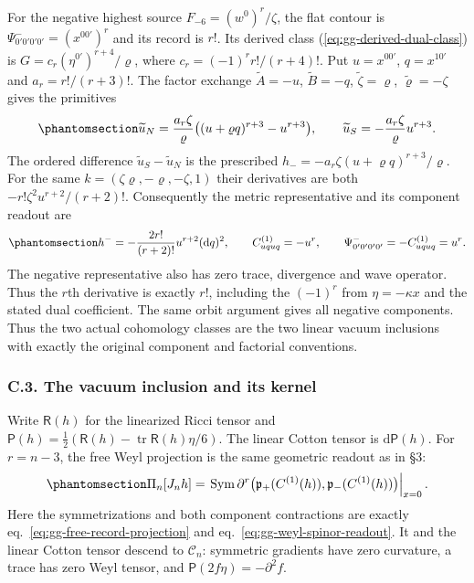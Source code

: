\documentclass[
  english,
  11pt,
  reqno]{amsart}
\begin{document}
For the negative highest source \(F_{-6}=(w^0)^r/\zeta\), the flat
contour is \(\Psi^-_{0'0'0'0'}=(x^{00'})^r\) and its record is \(r!\).
Its derived class (\ref{eq:gg-derived-dual-class}) is
\(G=c_r(\eta^{0'})^{r+4}/\varrho\), where \(c_r=(-1)^rr!/(r+4)!\). Put
\(u=x^{00'}\), \(q=x^{10'}\) and \(a_r=r!/(r+3)!\). The factor exchange
\(\widetilde A=-u\), \(\widetilde B=-q\), \(\widetilde\zeta=\varrho\),
\(\widetilde\varrho=-\zeta\) gives the primitives
\begin{equation}\protect\phantomsection\label{eq:gg-contact-negative-highest-primitives}{
 \widetilde u_N=\frac{a_r\zeta}{\varrho}
                  \bigl((u+\varrho q)^{r+3}-u^{r+3}\bigr),\qquad
 \widetilde u_S=-\frac{a_r\zeta}{\varrho}u^{r+3} .
}\end{equation} The ordered difference \(\widetilde u_S-\widetilde u_N\)
is the prescribed \(h_-=-a_r\zeta(u+\varrho q)^{r+3}/\varrho\). For the
same \(k=(\zeta\varrho,-\varrho,-\zeta,1)\) their derivatives are both
\(-r!\zeta^2u^{r+2}/(r+2)!\). Consequently the metric representative and
its component readout are
\begin{equation}\protect\phantomsection\label{eq:gg-contact-negative-component-readout}{
 h^-=-\frac{2r!}{(r+2)!}u^{r+2}(\mathrm dq)^2,\qquad
 C^{(1)}_{uquq}=-u^r,\qquad
 \Psi^-_{0'0'0'0'}=-C^{(1)}_{uquq}=u^r .
}\end{equation} The negative representative also has zero trace,
divergence and wave operator. Thus the \(r\)th derivative is exactly
\(r!\), including the \((-1)^r\) from \(\eta=-\kappa x\) and the stated
dual coefficient. The same orbit argument gives all negative components.
Thus the two actual cohomology classes are the two linear vacuum
inclusions with exactly the original component and factorial
conventions.

\protect{}\label{sec:gg-linear-vacuum-inclusion}

\subsubsection{C.3. The vacuum inclusion and its
kernel}\label{c.3.-the-vacuum-inclusion-and-its-kernel}

Write \(\mathsf R(h)\) for the linearized Ricci tensor and
\(\mathsf P(h)=\frac12(\mathsf R(h)-\operatorname{tr}\mathsf R(h)\eta/6)\).
The linear Cotton tensor is \(\mathrm d\mathsf P(h)\). For \(r=n-3\),
the free Weyl projection is the same geometric readout as in §3:
\begin{equation}\protect\phantomsection\label{eq:gg-contact-free-projection-readout}{
 \Pi_n[J_nh]=
 \left.\operatorname{Sym}\partial^r
       \bigl(\mathfrak p_+(C^{(1)}(h)),
             \mathfrak p_-(C^{(1)}(h))\bigr)\right|_{x=0} .
}\end{equation} Here the symmetrizations and both component contractions
are exactly eq.~\ref{eq:gg-free-record-projection} and
eq.~\ref{eq:gg-weyl-spinor-readout}. It and the linear Cotton tensor
descend to \(\mathscr C_n\): symmetric gradients have zero curvature, a
trace has zero Weyl tensor, and \(\mathsf P(2f\eta)=-\partial^2f\).
\end{document}
